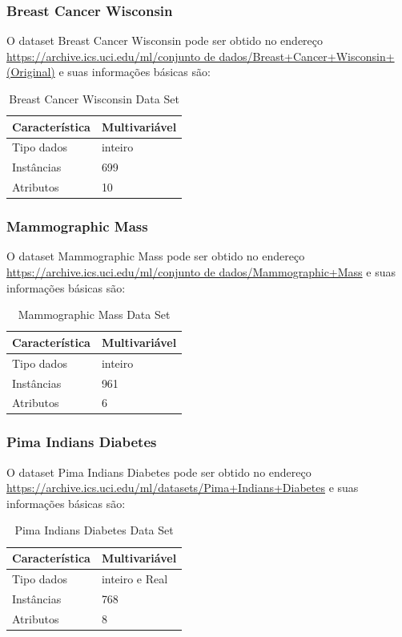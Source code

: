 \documentclass[12pt, a4paper]{article}
\begin{document}
\subsubsection{Breast Cancer Wisconsin}
O dataset Breast Cancer Wisconsin pode ser obtido no endereço \url{https://archive.ics.uci.edu/ml/conjunto de dados/Breast+Cancer+Wisconsin+(Original)} e suas informações básicas são:
\begin{table}[!ht]
\centering
\caption{Breast Cancer Wisconsin Data Set}
\label{breasttable}
\begin{tabular}{|l|l|}
\hline
Característica & Multivariável\\
\hline
Tipo dados & inteiro \\
\hline
Instâncias & 699 \\
\hline
Atributos & 10\\
\hline
\end{tabular}
\end{table}

\subsubsection{Mammographic Mass}
O dataset Mammographic Mass pode ser obtido no endereço \url{https://archive.ics.uci.edu/ml/conjunto de dados/Mammographic+Mass} e suas informações básicas são:
\begin{table}[!ht]
\centering
\caption{Mammographic Mass Data Set}
\label{mammographictable}
\begin{tabular}{|l|l|}
\hline
Característica & Multivariável\\
\hline
Tipo dados & inteiro \\
\hline
Instâncias & 961 \\
\hline
Atributos & 6\\
\hline
\end{tabular}
\end{table}

\subsubsection{Pima Indians Diabetes}
O dataset Pima Indians Diabetes pode ser obtido no endereço \url{https://archive.ics.uci.edu/ml/datasets/Pima+Indians+Diabetes} e suas informações básicas são:
\begin{table}[!ht]
\centering
\caption{Pima Indians Diabetes Data Set}
\label{pimatable}
\begin{tabular}{|l|l|}
\hline
Característica & Multivariável\\
\hline
Tipo dados & inteiro e Real \\
\hline
Instâncias & 768 \\
\hline
Atributos & 8\\
\hline
\end{tabular}
\end{table}
\end{document}
